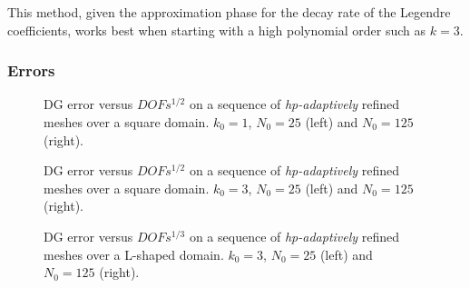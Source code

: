 This method, given the approximation phase for the decay rate of the Legendre coefficients, works best when starting with a high polynomial order such as $k = 3$.

\newpage
\subsubsection{Errors}

\begin{figure}[!ht]
    \begin{subfigure}[b]{0.45\textwidth}
		
	\end{subfigure}
	\hfill
	\begin{subfigure}[b]{0.45\textwidth}
		
	\end{subfigure}
    \caption{DG error versus $DOFs^{1/2}$ on a sequence of \textit{hp-adaptively} refined meshes over a square domain. $k_0 = 1$, $N_0 = 25$ (left) and $N_0 = 125$ (right).}
\end{figure}

% 		
% 		

\newpage

\begin{figure}[!ht]
    \begin{subfigure}[b]{0.45\textwidth}
		
	\end{subfigure}
	\hfill
	\begin{subfigure}[b]{0.45\textwidth}
		
	\end{subfigure}
    \caption{DG error versus $DOFs^{1/2}$ on a sequence of \textit{hp-adaptively} refined meshes over a square domain. $k_0 = 3$, $N_0 = 25$ (left) and $N_0 = 125$ (right).}
\end{figure}

\begin{figure}[!ht]
    \begin{subfigure}[b]{0.45\textwidth}
		
	\end{subfigure}
	\hfill
	\begin{subfigure}[b]{0.45\textwidth}
		
	\end{subfigure}
    \caption{DG error versus $DOFs^{1/3}$ on a sequence of \textit{hp-adaptively} refined meshes over a L-shaped domain. $k_0 = 3$, $N_0 = 25$ (left) and $N_0 = 125$ (right).}
\end{figure}

